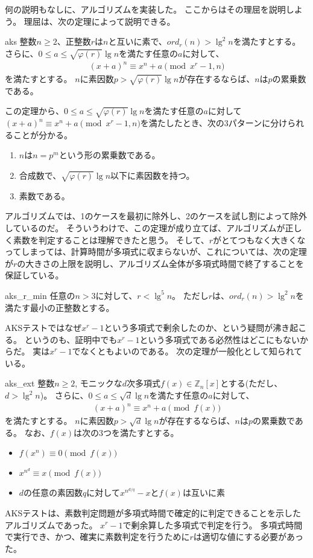 何の説明もなしに、アルゴリズムを実装した。
ここからはその理屈を説明しよう。
理屈は、次の定理によって説明できる。

\begin{Theo}{}{aks}
整数$n\ge2$、正整数$r$は$n$と互いに素で、$ord_r(n)>\lg^2{n}$を満たすとする。
さらに、$0\le a \le\sqrt{\varphi(r)}\lg{n}$を満たす任意の$a$に対して、
\begin{align*}
(x+a)^n \equiv x^n + a \pmod{x^r-1, n}
\end{align*}
を満たすとする。
$n$に素因数$p>\sqrt{\varphi(r)}\lg{n}$が存在するならば、$n$は$p$の累乗数である。
\end{Theo}

この定理から、$0\le a \le\sqrt{\varphi(r)}\lg{n}$を満たす任意の$a$に対して$(x+a)^n \equiv x^n + a \pmod{x^r-1, n}$を満たしたとき、次の3パターンに分けられることが分かる。
\begin{enumerate}
 \item $n$は$n=p^m$という形の累乗数である。
 \item 合成数で、$\sqrt{\varphi(r)}\lg{n}$以下に素因数を持つ。
 \item 素数である。
\end{enumerate}

アルゴリズムでは、1のケースを最初に除外し、2のケースを試し割によって除外しているのだ。
そういうわけで、この定理が成り立てば、アルゴリズムが正しく素数を判定することは理解できたと思う。
そして、$r$がとてつもなく大きくなってしまっては、計算時間が多項式に収まらないが、これについては、次の定理が$r$の大きさの上限を説明し、アルゴリズム全体が多項式時間で終了することを保証している。

\begin{Theo}{}{aks_r_min}
任意の$n>3$に対して、$r<\lg^5{n}$。
ただし$r$は、$ord_r(n) > \lg^2{n}$を満たす最小の正整数とする。
\end{Theo}

AKSテストではなぜ$x^r-1$という多項式で剰余したのか、という疑問が沸き起こる。
というのも、証明中でも$x^r-1$という多項式である必然性はどこにもないからだ。
実は$x^r-1$でなくともよいのである。
次の定理が一般化として知られている。

\begin{Theo}{}{aks_ext}
整数$n\ge2$, モニックな$d$次多項式$f(x)\in\mathbb{Z}_n[x]$とする(ただし、$d>\lg^2{n}$)。
さらに、$0\le a \le\sqrt{d}\lg{n}$を満たす任意の$a$に対して、
\begin{align*}
(x+a)^n\equiv x^n+a\pmod{f(x)}
\end{align*}
を満たすとする。
$n$に素因数$p>\sqrt{d}\lg{n}$が存在するならば、$n$は$p$の累乗数である。
なお、$f(x)$は次の3つを満たすとする。
\begin{itemize}
\item $f(x^n) \equiv 0 \pmod{f(x)}$
\item $x^{n^d}\equiv x\pmod{f(x)}$
\item $d$の任意の素因数$q$に対して$x^{n^{d/q}}-x$と$f(x)$は互いに素
\end{itemize}
\end{Theo}

AKSテストは、素数判定問題が多項式時間で確定的に判定できることを示したアルゴリズムであった。
$x^r-1$で剰余算した多項式で判定を行う。
多項式時間で実行でき、かつ、確実に素数判定を行うために$r$は適切な値にする必要があった。
